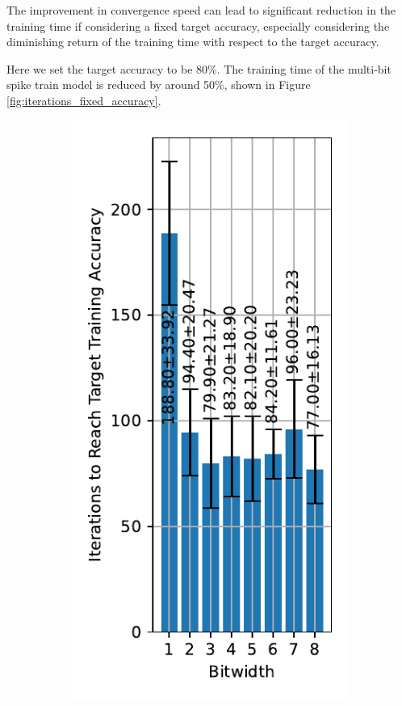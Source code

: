     The improvement in convergence speed can lead to significant reduction in the training time if considering a fixed target accuracy, especially considering the diminishing return of the training time with respect to the target accuracy. 

    Here we set the target accuracy to be 80\%. The training time of the multi-bit spike train model is reduced by around 50\%, shown in Figure \ref{fig:iterations_fixed_accuracy}. 
    \begin{figure}[!htpb]
        \centering
        \begin{subfigure}[H]{0.45\textwidth}
            \centering
            \includegraphics[width=\textwidth]{../standard/FashionMNIST/plots/fashionmnist_train_iters.pdf}

\end{subfigure}
\end{figure}
